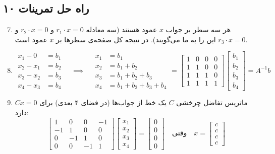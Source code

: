 \documentclass[12pt,a4paper]{article}
\begin{document}
{		\subsection*{راه حل تمرینات ۱۰}
		\begin{enumerate}
			\setcounter{enumi}{6}
			\item هر سه سطر بر جواب $x$ عمود هستند (سه معادله $r_1 \cdot x = 0$ و $r_2 \cdot x = 0$ و $r_3 \cdot x = 0$ این را به ما می‌گویند). در نتیجه کل صفحه‌ی سطرها بر $x$ عمود است.
			
			\item
			\[
			\begin{aligned}
				x_1 - 0 &= b_1 \\
				x_2 - x_1 &= b_2 \\
				x_3 - x_2 &= b_3 \\
				x_4 - x_3 &= b_4
			\end{aligned}
			\quad \implies \quad
			\begin{aligned}
				x_1 &= b_1 \\
				x_2 &= b_1+b_2 \\
				x_3 &= b_1+b_2+b_3 \\
				x_4 &= b_1+b_2+b_3+b_4
			\end{aligned}
			=
			\begin{bmatrix} 1 & 0 & 0 & 0 \\ 1 & 1 & 0 & 0 \\ 1 & 1 & 1 & 0 \\ 1 & 1 & 1 & 1 \end{bmatrix}
			\begin{bmatrix} b_1 \\ b_2 \\ b_3 \\ b_4 \end{bmatrix} = A^{-1}b
			\]
			
			\item ماتریس تفاضل چرخشی $C$ یک خط از جواب‌ها (در فضای ۴ بعدی) برای $Cx=0$ دارد:
			\[
			\begin{bmatrix} 1 & 0 & 0 & -1 \\ -1 & 1 & 0 & 0 \\ 0 & -1 & 1 & 0 \\ 0 & 0 & -1 & 1 \end{bmatrix}
			\begin{bmatrix} x_1 \\ x_2 \\ x_3 \\ x_4 \end{bmatrix} =
			\begin{bmatrix} 0 \\ 0 \\ 0 \\ 0 \end{bmatrix}
			\quad \text{وقتی} \quad x = \begin{bmatrix} c \\ c \\ c \\ c \end{bmatrix}
			\]
			

\end{enumerate}}
\end{document}
